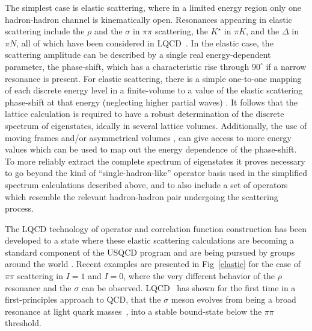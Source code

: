 The simplest case is elastic scattering, where in a limited energy region only one hadron-hadron channel is kinematically open. Resonances appearing in elastic scattering include the $\rho$ and the $\sigma$ in $\pi\pi$ scattering, the $K^\star$ in $\pi K$, and the $\Delta$ in $\pi N$, all of which have been considered in LQCD~\cite{%
Aoki:2007rd,
Feng:2010es,
Lang:2011mn,
Aoki:2011yj,
Dudek:2012xn,
Pelissier:2012pi,
Wilson:2015dqa,
Bali:2015gji,
Bulava:2016mks,
Guo:2016zos,
Briceno:2016mjc,
Guo:2018zss,
Bali:2015gji, Lang:2012sv, Fu:2012tj, Prelovsek:2013ela,Brett:2018jqw,
Andersen:2017una}.
%
In the elastic case, the scattering amplitude can be described by a single real energy-dependent parameter, the phase-shift, which has a characteristic rise through $90^\circ$ if a narrow resonance is present. For elastic scattering, there is a simple one-to-one mapping of each discrete energy level in a finite-volume to a value of the elastic scattering phase-shift at that energy (neglecting higher partial waves) \cite{Luscher:1986pf,Luscher:1990ck}. It follows that the lattice calculation is required to have a robust determination of the discrete spectrum of eigenstates, ideally in several lattice volumes. Additionally, the use of moving frames \cite{Rummukainen:1995vs} and/or asymmetrical volumes \cite{Li:2003jn,Detmold:2004qn}, can give access to more energy values which can be used to map out the energy dependence of the phase-shift. To more reliably extract the complete spectrum of eigenstates it proves necessary to go beyond the kind of ``single-hadron-like'' operator basis used in the simplified  spectrum calculations described above, and to also include a set of operators which resemble the relevant hadron-hadron pair undergoing the scattering process.

The LQCD technology of operator and correlation function construction has been developed to a state where these elastic scattering calculations are becoming a standard component of the USQCD program and are being pursued by groups around the world
\cite{
Aoki:2007rd,
Feng:2010es,
Lang:2011mn,
Aoki:2011yj,
Dudek:2012xn,
Pelissier:2012pi,
Mohler:2012na, 
Prelovsek:2013cra, 
Lang:2014yfa,
Bali:2015gji,
Lang:2015sba,
Lang:2016jpk,
Bulava:2016mks}. Recent examples are presented in Fig~\ref{elastic} for the case of $\pi\pi$ scattering in $I=1$ and $I=0$, where the very different behavior of the $\rho$ resonance and the $\sigma$ can be observed. LQCD~\cite{Briceno:2016mjc} has shown for the first time in a first-principles approach to QCD, that the $\sigma$ meson evolves from being a broad resonance at light quark masses~\cite{Guo:2018zss}, into a stable bound-state below the $\pi\pi$ threshold. 

